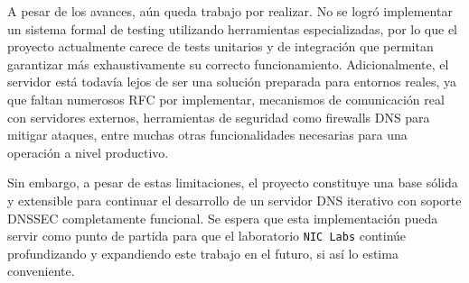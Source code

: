 A pesar de los avances, aún queda trabajo por realizar. No se logró implementar un sistema formal de testing utilizando herramientas especializadas, por lo que el proyecto actualmente carece 
de tests unitarios y de integración que permitan garantizar más exhaustivamente su correcto funcionamiento. Adicionalmente, el servidor está todavía lejos de ser una solución preparada para 
entornos reales, ya que faltan numerosos RFC por implementar, mecanismos de comunicación real con servidores externos, herramientas de seguridad como firewalls DNS para mitigar ataques, entre 
muchas otras funcionalidades necesarias para una operación a nivel productivo.

Sin embargo, a pesar de estas limitaciones, el proyecto constituye una base sólida y extensible para continuar el desarrollo de un servidor DNS iterativo con soporte DNSSEC completamente 
funcional. Se espera que esta implementación pueda servir como punto de partida para que el laboratorio \texttt{NIC Labs} continúe profundizando y expandiendo este trabajo en el futuro, 
si así lo estima conveniente.


